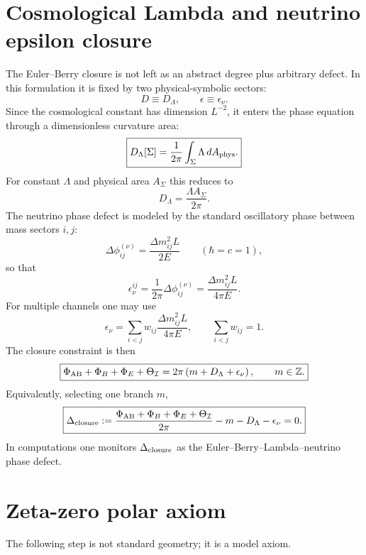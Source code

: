 \documentclass[11pt,a4paper]{article}
\begin{document}
\section{Cosmological Lambda and neutrino epsilon closure}
The Euler--Berry closure is not left as an abstract degree plus arbitrary defect.  In this formulation it is fixed by two physical-symbolic sectors:
\begin{equation}
D\equiv D_\Lambda,
\qquad
\epsilon\equiv\epsilon_\nu.
\end{equation}
Since the cosmological constant has dimension $L^{-2}$, it enters the phase equation through a dimensionless curvature area:
\begin{equation}
\boxed{D_\Lambda[\Sigma]=\frac{1}{2\pi}\int_\Sigma \Lambda\,dA_{\rm phys}.}
\end{equation}
For constant $\Lambda$ and physical area $A_\Sigma$ this reduces to
\begin{equation}
\boxed{D_\Lambda=\frac{\Lambda A_\Sigma}{2\pi}.}
\end{equation}
The neutrino phase defect is modeled by the standard oscillatory phase between mass sectors $i,j$:
\begin{equation}
\Delta\phi_{ij}^{(\nu)}=\frac{\Delta m_{ij}^2L}{2E}\qquad (\hbar=c=1),
\end{equation}
so that
\begin{equation}
\boxed{\epsilon_\nu^{ij}=\frac{1}{2\pi}\Delta\phi_{ij}^{(\nu)}=\frac{\Delta m_{ij}^2L}{4\pi E}.}
\end{equation}
For multiple channels one may use
\begin{equation}
\epsilon_\nu=\sum_{i<j}w_{ij}\frac{\Delta m_{ij}^2L}{4\pi E},
\qquad \sum_{i<j}w_{ij}=1.
\end{equation}
The closure constraint is then
\begin{equation}
\boxed{\Phi_{\rm AB}+\Phi_B+\Phi_E+\Theta_{\mathcal I}=2\pi\left(m+D_\Lambda+\epsilon_\nu\right),\qquad m\in\mathbb Z.}
\end{equation}
Equivalently, selecting one branch $m$,
\begin{equation}
\boxed{\Delta_{\rm closure}:=\frac{\Phi_{\rm AB}+\Phi_B+\Phi_E+\Theta_{\mathcal I}}{2\pi}-m-D_\Lambda-\epsilon_\nu=0.}
\end{equation}
In computations one monitors $\Delta_{\rm closure}$ as the Euler--Berry--Lambda--neutrino phase defect.

\section{Zeta-zero polar axiom}
The following step is not standard geometry; it is a model axiom.
\end{document}
